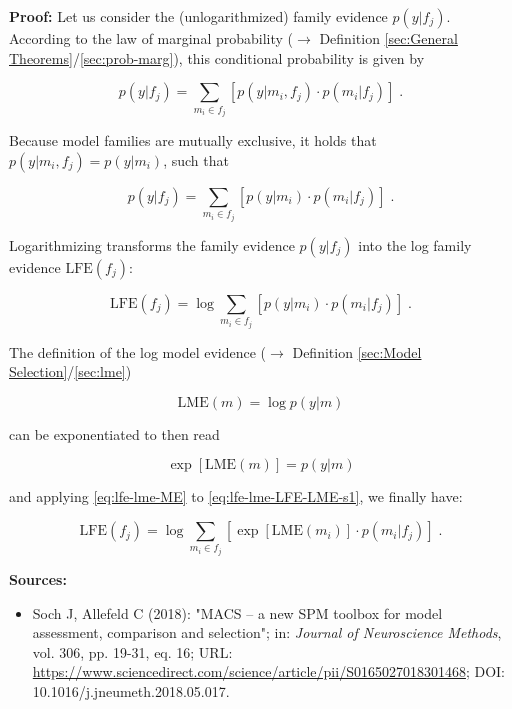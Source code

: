 \documentclass[a4paper,12pt,twoside]{book}
\begin{document}
\vspace{1em}
\textbf{Proof:} Let us consider the (unlogarithmized) family evidence $p(y \vert f_j)$. According to the law of marginal probability ($\rightarrow$ Definition \ref{sec:General Theorems}/\ref{sec:prob-marg}), this conditional probability is given by

\begin{equation} \label{eq:lfe-lme-FE-ME-s1}
p(y|f_j) = \sum_{m_i \in f_j} \left[ p(y|m_i,f_j) \cdot p(m_i|f_j) \right] \; .
\end{equation}

Because model families are mutually exclusive, it holds that $p(y \vert m_i,f_j) = p(y \vert m_i)$, such that

\begin{equation} \label{eq:lfe-lme-FE-ME-s2}
p(y|f_j) = \sum_{m_i \in f_j} \left[ p(y|m_i) \cdot p(m_i|f_j) \right] \; .
\end{equation}

Logarithmizing transforms the family evidence $p(y \vert f_j)$ into the log family evidence $\mathrm{LFE}(f_j)$:

\begin{equation} \label{eq:lfe-lme-LFE-LME-s1}
\mathrm{LFE}(f_j) = \log \sum_{m_i \in f_j} \left[ p(y|m_i) \cdot p(m_i|f_j) \right] \; .
\end{equation}

The definition of the log model evidence ($\rightarrow$ Definition \ref{sec:Model Selection}/\ref{sec:lme})

\begin{equation} \label{eq:lfe-lme-LME}
\mathrm{LME}(m) = \log p(y|m)
\end{equation}

can be exponentiated to then read

\begin{equation} \label{eq:lfe-lme-ME}
\exp\left[ \mathrm{LME}(m) \right] = p(y|m)
\end{equation}

and applying \eqref{eq:lfe-lme-ME} to \eqref{eq:lfe-lme-LFE-LME-s1}, we finally have:

\begin{equation} \label{eq:lfe-lme-LFE-LME-s2}
\mathrm{LFE}(f_j) = \log \sum_{m_i \in f_j} \left[ \exp[\mathrm{LME}(m_i)] \cdot p(m_i|f_j) \right] \; .
\end{equation}


\vspace{1em}
\textbf{Sources:}
\begin{itemize}
\item Soch J, Allefeld C (2018): "MACS – a new SPM toolbox for model assessment, comparison and selection"; in: \textit{Journal of Neuroscience Methods}, vol. 306, pp. 19-31, eq. 16; URL: \url{https://www.sciencedirect.com/science/article/pii/S0165027018301468}; DOI: 10.1016/j.jneumeth.2018.05.017.
\end{itemize}
\end{document}
